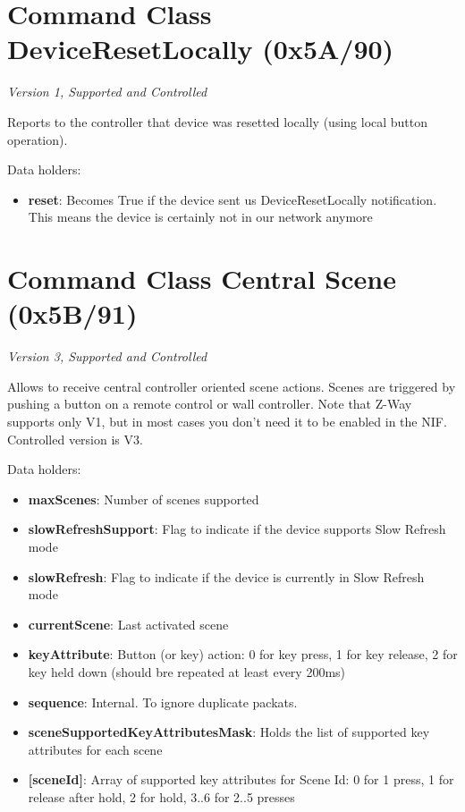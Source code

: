 \section{Command Class DeviceResetLocally (0x5A/90)}

\textit{Version 1, Supported and Controlled}
\newline

Reports to the controller that device was resetted locally (using local button operation).
\newline

\noindent
Data holders:

\begin{itemize}
\item \textbf{reset}: Becomes True if the device sent us DeviceResetLocally notification. This means the device is certainly not in our network anymore
\end{itemize}


\section{Command Class Central Scene (0x5B/91)}

\textit{Version 3, Supported and Controlled}
\newline

Allows to receive central controller oriented scene actions. Scenes are triggered by pushing a button on a remote control or wall controller. Note that Z-Way supports only V1, but in most cases you don't need it to be enabled in the NIF. Controlled version is V3.
\newline

\noindent
Data holders:

\begin{itemize}
\item \textbf{maxScenes}: Number of scenes supported
\item \textbf{slowRefreshSupport}: Flag to indicate if the device supports Slow Refresh mode
\item \textbf{slowRefresh}: Flag to indicate if the device is currently in Slow Refresh mode
\item \textbf{currentScene}: Last activated scene
\item \textbf{keyAttribute}: Button (or key) action: 0 for key press, 1 for key release, 2 for key held down (should bre repeated at least every 200ms)
\item \textbf{sequence}: Internal. To ignore duplicate packats.
\item \textbf{sceneSupportedKeyAttributesMask}: Holds the list of supported key attributes for each scene
\item \qquad\textbf{[sceneId]}: Array of supported key attributes for Scene Id: 0 for 1 press, 1 for release after hold, 2 for hold, 3..6 for 2..5 presses
\end{itemize}
